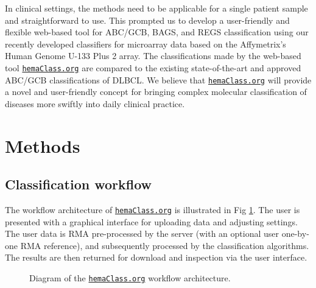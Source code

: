 \documentclass[10pt,letterpaper]{article}
\newcommand{\hemaClass}{\href{http://hemaClass.org}{\texttt{hemaClass.org}}}
\begin{document}
In clinical settings, the methods need to be applicable for a single patient sample and straightforward to use.
This prompted us to develop a user-friendly and flexible web-based tool for ABC/GCB, BAGS, and REGS classification using our recently developed classifiers for microarray data based on the Affymetrix's Human Genome U-133 Plus 2 array.
The classifications made by the web-based tool \hemaClass{} are compared to the existing state-of-the-art and approved ABC/GCB classifications of DLBCL.
We believe that \hemaClass{} will provide a novel and user-friendly concept for bringing complex molecular classification of diseases more swiftly into daily clinical practice.

 
\section*{Methods}
\subsection*{Classification workflow}
The workflow architecture of \hemaClass{} is illustrated in Fig \mbox{\ref{fig:webtooldiagram}}. The user is presented with a graphical interface for uploading data and adjusting settings. The user data is RMA pre-processed by the server (with an optional user one-by-one RMA reference), and subsequently processed by the classification algorithms. The results are then returned for download and inspection via the user interface.

\begin{figure}
	\begin{center}
	\end{center}
	\caption{Diagram of the \hemaClass{} workflow architecture.}
	\label{fig:webtooldiagram}
\end{figure}
\end{document}
